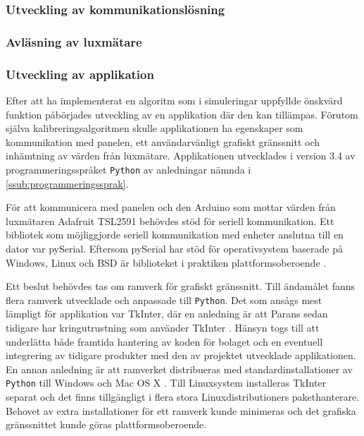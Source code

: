         \subsubsection{Utveckling av kommunikationslösning} %
        \label{ssub:utveckling_av_kommunikationslosning}

        \subsubsection{Avläsning av luxmätare} %
        \label{ssub:avlasning_av_luxmatare}

        \subsubsection{Utveckling av applikation} %
        \label{ssub:utveckling_av_applikation}
            Efter att ha implementerat en algoritm som i simuleringar uppfyllde önskvärd funktion påbörjades utveckling av en applikation där den kan tillämpas. Förutom själva kalibreringsalgoritmen skulle applikationen ha egenskaper som kommunikation med panelen, ett användarvänligt grafiskt gränssnitt och inhämtning av värden från luxmätare. Applikationen utvecklades i version 3.4 av programmeringsspråket \texttt{Python} av anledningar nämnda i \ref{ssub:programmeringssprak}. \bigskip

            För att kommunicera med panelen och den Arduino som mottar värden från luxmätaren Adafruit TSL2591 behövdes stöd för seriell kommunikation. Ett bibliotek som möjliggjorde seriell kommunikation med enheter anslutna till en dator var pySerial. Eftersom pySerial har stöd för operativsystem baserade på Windows, Linux och BSD är biblioteket i praktiken plattformsoberoende \cite{pyserial}. \bigskip

            Ett beslut behövdes tas om ramverk för grafiskt gränssnitt. Till ändamålet fanns flera ramverk utvecklade och anpassade till \texttt{Python}. Det som ansågs mest lämpligt för applikation var TkInter, där en anledning är att Parans sedan tidigare har kringutrustning som använder TkInter \cite{solarremote}. Hänsyn togs till att underlätta både framtida hantering av koden för bolaget och en eventuell integrering av tidigare produkter med den av projektet utvecklade applikationen. En annan anledning är att ramverket distribueras med standardinstallationer av \texttt{Python} till Windows och Mac OS X \cite{tkinter}. Till Linuxsystem installeras TkInter separat och det finns tillgängligt i flera stora Linuxdistributioners pakethanterare. Behovet av extra installationer för ett ramverk kunde minimeras och det grafiska gränssnittet kunde göras plattformsoberoende. \bigskip

